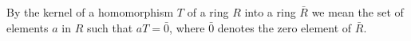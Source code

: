 By the kernel of a homomorphism $T$ of a ring $R$ into a ring $\bar{R}$ we mean the set of elements $a$ in $R$ such that $aT = \bar{0}$, where $\bar{0}$ denotes the zero element of $\bar{R}$.
